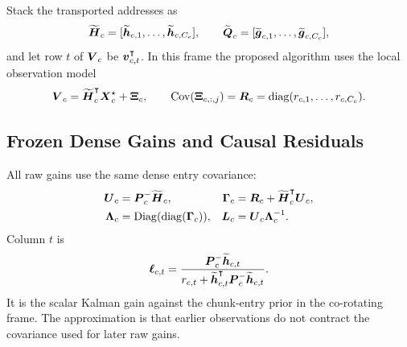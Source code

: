 \documentclass[11pt,letterpaper,logo]{yalearxiv}
\newcommand{\Diag}{\operatorname{Diag}}
\begin{document}
Stack the transported addresses as
\begin{equation}
  \widetilde{\boldsymbol{H}}_c
  =
  [\widetilde{\boldsymbol{h}}_{c,1},\ldots,\widetilde{\boldsymbol{h}}_{c,C_c}],
  \qquad
  \widetilde{\boldsymbol{Q}}_c
  =
  [\widetilde{\boldsymbol{g}}_{c,1},\ldots,\widetilde{\boldsymbol{g}}_{c,C_c}],
  \label{eq:kdn2-hq-stack}
\end{equation}
and let row $t$ of $\boldsymbol{V}_c$ be $\boldsymbol{v}_{c,t}^{\intercal}$. In this frame the proposed algorithm uses
the local observation model
\begin{equation}
  \boldsymbol{V}_c
  =
  \widetilde{\boldsymbol{H}}_c^{\intercal}\boldsymbol{X}_c^\star+\boldsymbol{\Xi}_c,
  \qquad
  \operatorname{Cov}(\boldsymbol{\Xi}_{c,:,j})
  =
  \boldsymbol{R}_c
  =
  \operatorname{diag}(r_{c,1},\ldots,r_{c,C_c}).
  \label{eq:kdn2-chunk-observation}
\end{equation}

\subsection{Frozen Dense Gains and Causal Residuals}
\label{sec:kdn2-frozen-gains}

All raw gains use the same dense entry covariance:
\begin{equation}
\begin{aligned}
  \ve{U}_c
  &=
  \ve{P}_c^-\widetilde{\ve{H}}_c,
  &
  \ve{\Gamma}_c
  &=
  \ve{R}_c+\widetilde{\ve{H}}_c^{\tr}\ve{U}_c,
  \\
  \ve{\Lambda}_c
  &=
  \Diag(\diag(\ve{\Gamma}_c)),
  &
  \ve{L}_c
  &=
  \ve{U}_c\ve{\Lambda}_c^{-1}.
\end{aligned}
\label{eq:kdn2-u-gamma}
\end{equation}
Column $t$ is
\begin{equation}
  \boldsymbol{\ell}_{c,t}
  =
  \frac{\boldsymbol{P}_c^-\widetilde{\boldsymbol{h}}_{c,t}}
  {r_{c,t}
   +\widetilde{\boldsymbol{h}}_{c,t}^{\intercal}
    \boldsymbol{P}_c^-\widetilde{\boldsymbol{h}}_{c,t}}.
  \label{eq:kdn2-raw-gain}
\end{equation}
It is the scalar Kalman gain against the chunk-entry prior in the co-rotating frame. The
approximation is that earlier observations do not contract the covariance used for later raw
gains.
\end{document}
